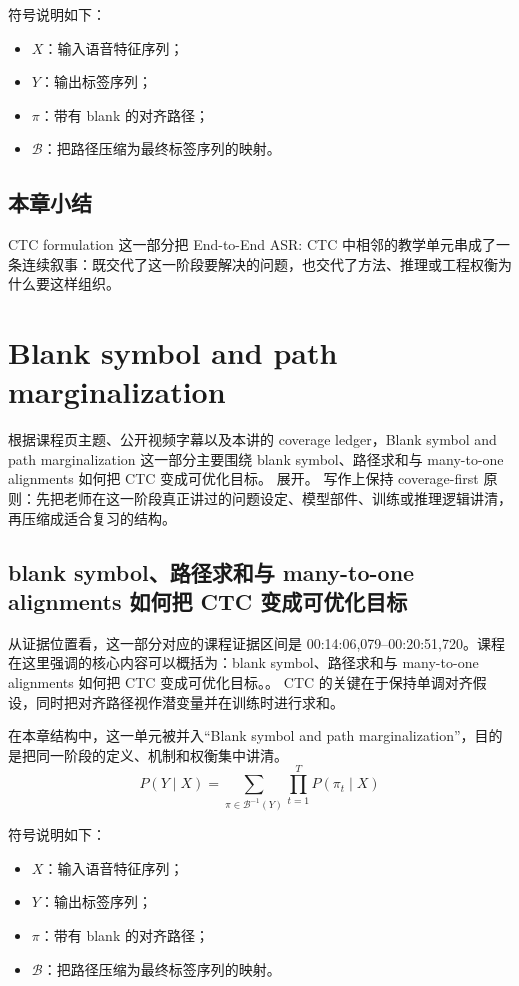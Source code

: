 \documentclass[a4paper]{article}
\begin{document}
符号说明如下：
\begin{itemize}
\item $X$：输入语音特征序列；
\item $Y$：输出标签序列；
\item $\pi$：带有 blank 的对齐路径；
\item $\mathcal{B}$：把路径压缩为最终标签序列的映射。
\end{itemize}

\subsection{本章小结}
CTC formulation 这一部分把 End-to-End ASR: CTC 中相邻的教学单元串成了一条连续叙事：既交代了这一阶段要解决的问题，也交代了方法、推理或工程权衡为什么要这样组织。

\section{Blank symbol and path marginalization}
根据课程页主题、公开视频字幕以及本讲的 coverage ledger，Blank symbol and path marginalization 这一部分主要围绕 blank symbol、路径求和与 many-to-one alignments 如何把 CTC 变成可优化目标。 展开。
写作上保持 coverage-first 原则：先把老师在这一阶段真正讲过的问题设定、模型部件、训练或推理逻辑讲清，再压缩成适合复习的结构。

\subsection{blank symbol、路径求和与 many-to-one alignments 如何把 CTC 变成可优化目标}
从证据位置看，这一部分对应的课程证据区间是 00:14:06,079--00:20:51,720。课程在这里强调的核心内容可以概括为：blank symbol、路径求和与 many-to-one alignments 如何把 CTC 变成可优化目标。。
CTC 的关键在于保持单调对齐假设，同时把对齐路径视作潜变量并在训练时进行求和。

在本章结构中，这一单元被并入“Blank symbol and path marginalization”，目的是把同一阶段的定义、机制和权衡集中讲清。
\[
P(Y \mid X) = \sum_{\pi \in \mathcal{B}^{-1}(Y)} \prod_{t=1}^{T} P(\pi_t \mid X)
\]

符号说明如下：
\begin{itemize}
\item $X$：输入语音特征序列；
\item $Y$：输出标签序列；
\item $\pi$：带有 blank 的对齐路径；
\item $\mathcal{B}$：把路径压缩为最终标签序列的映射。
\end{itemize}
\end{document}
